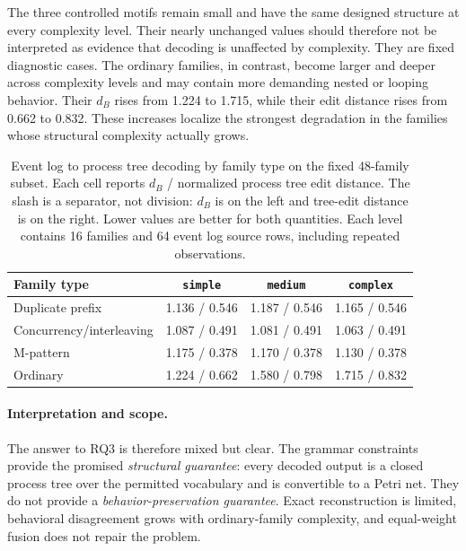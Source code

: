 \documentclass[mathematics,article,submit,moreauthors]{Definitions/mdpi}
\begin{document}
The three controlled motifs remain small and have the same designed structure at every complexity level. Their nearly unchanged values should therefore not be interpreted as evidence that decoding is unaffected by complexity. They are fixed diagnostic cases. The ordinary families, in contrast, become larger and deeper across complexity levels and may contain more demanding nested or looping behavior. Their $d_B$ rises from 1.224 to 1.715, while their edit distance rises from 0.662 to 0.832. These increases localize the strongest degradation in the families whose structural complexity actually grows.

\begin{table}[!b]
\centering
\caption{Event log to process tree decoding by family type on the fixed 48-family subset. Each cell reports $d_B$ / normalized process tree edit distance. The slash is a separator, not division: $d_B$ is on the left and tree-edit distance is on the right. Lower values are better for both quantities. Each level contains 16 families and 64 event log source rows, including repeated observations.}
\label{tab:motif-decode}
\begin{tabular}{@{}lccc@{}}
\toprule
Family type & \texttt{simple} & \texttt{medium} & \texttt{complex} \\
\midrule
Duplicate prefix & 1.136 / 0.546 & 1.187 / 0.546 & 1.165 / 0.546 \\
Concurrency/interleaving & 1.087 / 0.491 & 1.081 / 0.491 & 1.063 / 0.491 \\
M-pattern & 1.175 / 0.378 & 1.170 / 0.378 & 1.130 / 0.378 \\
Ordinary & 1.224 / 0.662 & 1.580 / 0.798 & 1.715 / 0.832 \\
\bottomrule
\end{tabular}
\end{table}

\paragraph{Interpretation and scope.}
The answer to RQ3 is therefore mixed but clear. The grammar constraints provide the promised \emph{structural guarantee}: every decoded output is a closed process tree over the permitted vocabulary and is convertible to a Petri net. They do not provide a \emph{behavior-preservation guarantee}. Exact reconstruction is limited, behavioral disagreement grows with ordinary-family complexity, and equal-weight fusion does not repair the problem.
\end{document}
